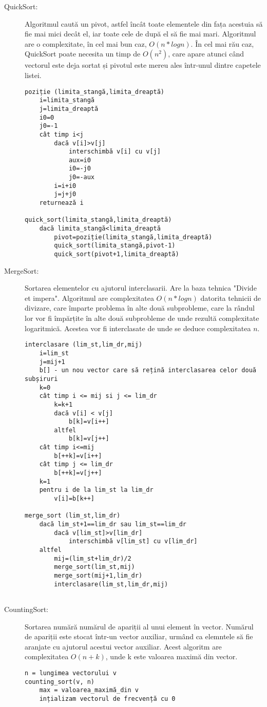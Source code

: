 \documentclass[12pt]{article}
\begin{document}
\begin{description}
\item[QuickSort:]
Algoritmul caută un pivot, astfel încât toate elementele din fața acestuia să fie mai mici decât el, iar toate cele de după el să fie mai mari. Algoritmul are o complexitate, în cel mai bun caz, $O(n*logn).$
În cel mai rău caz, QuickSort poate necesita un timp de $O(n^2)$, care apare atunci când vectorul este deja sortat și pivotul este mereu ales într-unul dintre capetele listei. 
\begin{verbatim}
poziție (limita_stangă,limita_dreaptă)
    i=limita_stangă
    j=limita_dreaptă
    i0=0
    j0=-1
    cât timp i<j
        dacă v[i]>v[j]
            interschimbă v[i] cu v[j]
            aux=i0
            i0=-j0
            j0=-aux
        i=i+i0
        j=j+j0
    returnează i
    
quick_sort(limita_stangă,limita_dreaptă)
    dacă limita_stangă<limita_dreaptă
        pivot=poziție(limita_stangă,limita_dreaptă)
        quick_sort(limita_stangă,pivot-1)
        quick_sort(pivot+1,limita_dreaptă)
\end{verbatim}

\item[MergeSort:]
Sortarea elementelor cu ajutorul interclasarii. Are la baza tehnica "Divide et impera". Algoritmul are complexitatea $O(n*logn)$ datorita tehnicii de divizare, care împarte problema în alte două subprobleme, care la rândul lor vor fi împărțite în alte două subprobleme de unde rezultă complexitate logaritmică. Acestea vor fi interclasate de unde se deduce complexitatea $n$.

\begin{verbatim}
interclasare (lim_st,lim_dr,mij)
    i=lim_st
    j=mij+1
    b[] - un nou vector care să rețină interclasarea celor două subșiruri
    k=0
    cât timp i <= mij si j <= lim_dr
        k=k+1
        dacă v[i] < v[j]
            b[k]=v[i++]
        altfel
            b[k]=v[j++]
    cât timp i<=mij
        b[++k]=v[i++]
    cât timp j <= lim_dr
        b[++k]=v[j++]
    k=1
    pentru i de la lim_st la lim_dr
        v[i]=b[k++]

merge_sort (lim_st,lim_dr)
    dacă lim_st+1==lim_dr sau lim_st==lim_dr
        dacă v[lim_st]>v[lim_dr]
            interschimbă v[lim_st] cu v[lim_dr]
    altfel 
        mij=(lim_st+lim_dr)/2
        merge_sort(lim_st,mij)
        merge_sort(mij+1,lim_dr)
        interclasare(lim_st,lim_dr,mij)
    

\end{verbatim}
\item[CountingSort:]
Sortarea numără numărul de apariții al unui element în vector. Numărul de apariții este stocat într-un vector auxiliar, urmând ca elemntele să fie aranjate cu ajutorul acestui vector auxiliar. Acest algoritm are complexitatea $O(n+k)$, unde k este valoarea maximă din vector.
\begin{verbatim}
n = lungimea vectorului v
counting_sort(v, n)
    max = valoarea_maximă_din v   
    ințializam vectorul de frecvență cu 0
    

\end{verbatim}
\end{description}
\end{document}
